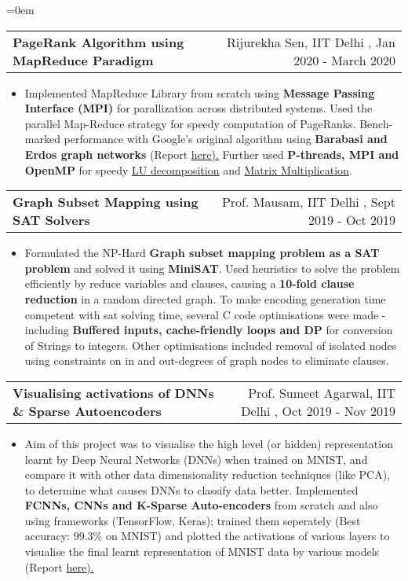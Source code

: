 \documentclass{article}
\makeatletter
\newenvironment{longversion}{}{} %
\newcommand{\headerrow}[2]
{\begin{tabular*}{\linewidth}{l@{\extracolsep{\fill}}r}
	#1 &
	#2 \\
\end{tabular*}}
\makeatother
\begin{document}
\begin{longversion}
\begin{list} {}{\leftmargin=0em}
  \headerrow { \textbf{PageRank Algorithm using MapReduce Paradigm}} {Rijurekha Sen, IIT Delhi , Jan 2020 - March 2020}
 \begin{itemize} \item[]
Implemented MapReduce Library from scratch using \textbf{Message Passing Interface (MPI)} for parallization across distributed systems. Used the parallel Map-Reduce strategy for speedy computation of PageRanks. Bench-marked performance with Google's original algorithm using \textbf{Barabasi and Erdos graph networks} (Report \href{https://csciitd-my.sharepoint.com/:b:/g/personal/ee1170938_iitd_ac_in/ETRCYtQZyERNnelC7dAxImgBCGVi6D2SiJsZIPZenOSA6A?e=VIVlSv}{here).} Further used \textbf{P-threads, MPI and OpenMP} for speedy \href{https://csciitd-my.sharepoint.com/:b:/g/personal/ee1170938_iitd_ac_in/EQe-lXmrRLBAs4KZilzr6ugBBbzGJZ9b4QnQIdcny4Xx1Q?e=wgTMUK}{LU decomposition} and \href{https://csciitd-my.sharepoint.com/:b:/g/personal/ee1170938_iitd_ac_in/EUY7HRbTuGJDhMuCqAheqvABeIpAnRtV1BpNegYGxpqnnw?e=Kv1n95}{Matrix Multiplication}.
 \end{itemize}
 
  \item[]
\headerrow { \textbf{Graph Subset Mapping using SAT Solvers}} {Prof. Mausam, IIT Delhi , Sept 2019 - Oct 2019}
 \begin{itemize} \item[]
Formulated the NP-Hard \textbf{Graph subset mapping problem as a SAT problem} and solved it using \textbf{MiniSAT}. Used heuristics to solve the problem efficiently by reduce variables and clauses, causing a \textbf{10-fold clause reduction} in a random directed graph. To make encoding generation time competent with sat solving time, several C code optimisations were made - including \textbf{Buffered inputs, cache-friendly loops and DP} for conversion of Strings to integers. Other optimisations included removal of isolated nodes using constraints on in and out-degrees of graph nodes to eliminate clauses.
 \end{itemize}

 \item[]
\headerrow { \textbf{Visualising activations of DNNs \& Sparse Autoencoders}} {Prof. Sumeet Agarwal, IIT Delhi , Oct 2019 - Nov 2019}
 \begin{itemize} \item[]
Aim of this project was to visualise the high level (or hidden) representation learnt by Deep Neural Networks (DNNs) when trained on MNIST, and compare it with other data dimensionality reduction techniques (like PCA), to determine what causes DNNs to classify data better. Implemented \textbf{FCNNs, CNNs and K-Sparse Auto-encoders} from scratch and also using frameworks (TensorFlow, Keras); trained them seperately (Best accuracy: 99.3\% on MNIST) and plotted the activations of various layers to visualise the final learnt representation of MNIST data by various models (Report \href{https://csciitd-my.sharepoint.com/:w:/g/personal/ee1170938_iitd_ac_in/EVa7dWSz8t1Dlt3IZ5EXa_QB3I0K054UPjTapzihmJpS-Q?e=kxSqDj}{here).}
 \end{itemize}
 

\end{list}
\end{longversion}
\end{document}
